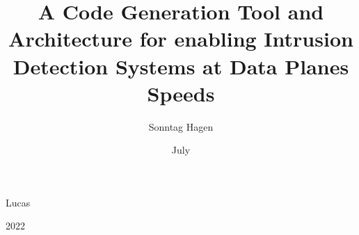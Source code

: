 

\title{A Code Generation Tool and Architecture for enabling Intrusion Detection Systems at Data Planes Speeds}
\author{Sonntag Hagen}{Lucas}
\date{July}{2022}




\maketitle






